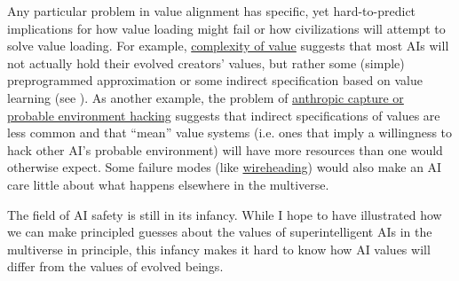 \documentclass[]{article}
\begin{document}
Any particular problem in value alignment has specific, yet
hard-to-predict implications for how value loading might fail or how
civilizations will attempt to solve value loading. For example,
\href{https://wiki.lesswrong.com/wiki/Complexity_of_value}{complexity
of value} suggests that most AIs will not actually hold their evolved
creators' values, but rather some (simple) preprogrammed approximation
or some indirect specification based on value learning (see
\cite{Bostrom2014-ay}). As another example, the problem of
\href{https://arbital.com/p/probable_environment_hacking/}{anthropic capture or probable
environment hacking} suggests that indirect specifications of values are less common and that
``mean'' value systems (i.e. ones that imply a willingness to hack other AI's probable environment)
will have more resources than one would otherwise expect.  Some failure modes (like
\href{https://casparoesterheld.com/2016/07/08/wireheading/}{wireheading}) would also make an
AI care little about what happens elsewhere in the multiverse.

The field of AI safety is still in its infancy. While I hope to have
illustrated how we can make principled guesses about the values of
superintelligent AIs in the multiverse in principle, this infancy makes
it hard to know how AI values will differ from the values of evolved
beings.

\begin{sloppypar} %
\printbibliography
\end{sloppypar}
\end{document}
